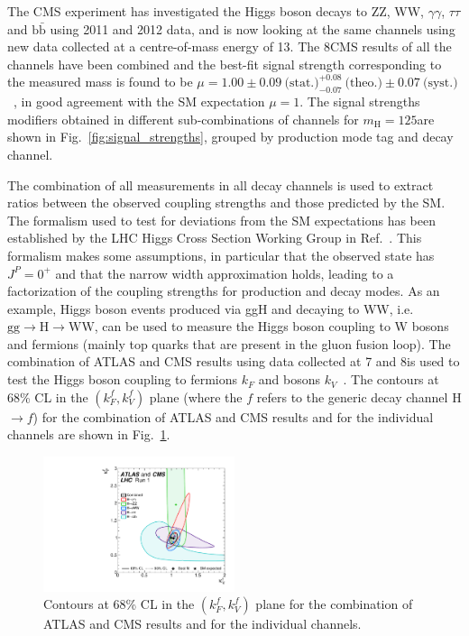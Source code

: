The CMS experiment has investigated the Higgs boson decays to ZZ, WW, $\gamma\gamma$, $\tau\tau$ and $\mathrm{b \bar b}$ using 2011 and 2012 data, and is now looking at the same channels using new data collected at a centre-of-mass energy of 13\TeV. The 8\TeV CMS results of all the channels have been combined and the best-fit signal strength corresponding to the measured mass is found to be $\mu = 1.00 \pm 0.09~\text{(stat.)} ^{+0.08}_{-0.07}~\text{(theo.)} \pm  0.07~\text{(syst.)}$~\cite{Khachatryan:2014jba}, in good agreement with the SM expectation $\mu=1$.
The signal strengths modifiers obtained in different sub-combinations of channels for $m_\mathrm{H}=125$\GeV are shown in Fig.~\ref{fig:signal_strengths}, grouped by production mode tag and decay channel.
    
The combination of all measurements in all decay channels is used to extract ratios between the observed coupling strengths and those predicted by the SM. The formalism used to test for deviations from the SM expectations has been established by the LHC Higgs Cross Section Working Group in Ref.~\cite{Heinemeyer:2013tqa}. This formalism makes some assumptions, in particular that the observed state has $J^P =0^+$ and that the narrow width approximation holds, leading to a factorization of the coupling strengths for production and decay modes. As an example, Higgs boson events produced via ggH and decaying to WW, i.e. $\mathrm{gg\to H\to WW}$, can be used to measure the Higgs boson coupling to W bosons and fermions (mainly top quarks that are present in the gluon fusion loop). The combination of ATLAS and CMS results using data collected at 7 and 8\TeV is used to test the Higgs boson coupling to fermions $k_F$ and bosons $k_V$~\cite{Khachatryan:2016vau}. The contours at 68\% CL in the $(k_F^f, k_V^f)$ plane (where the $f$ refers to the generic decay channel H$\to f$) for the combination of ATLAS and CMS results and for the individual channels are shown in Fig.~\ref{fig:couplings}.

\begin{figure}[htb]
\centering
\includegraphics[width=0.5\textwidth]{images/couplings.pdf}
\caption{Contours at 68\% CL in the $(k_F^f, k_V^f)$ plane for the combination of ATLAS and CMS results and for the individual channels.}\label{fig:couplings}
\end{figure}

